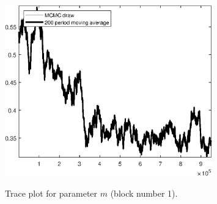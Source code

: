 \begin{figure}[H]
\centering
  \includegraphics[width=0.8\textwidth]{BRS_growth_util_sectoral/graphs/TracePlot_m_blck_1}\\
    \caption{Trace plot for parameter ${m}$ (block number 1).}
\end{figure}

